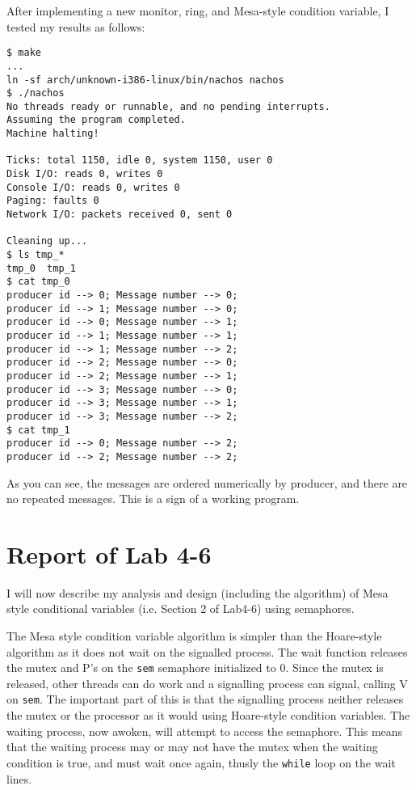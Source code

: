 \documentclass[11pt]{article}
\begin{document}
\begin{question}
    After implementing a new monitor, ring, and Mesa-style condition variable, I tested my results as follows:

    \begin{verbatim}
$ make
...
ln -sf arch/unknown-i386-linux/bin/nachos nachos
$ ./nachos
No threads ready or runnable, and no pending interrupts.
Assuming the program completed.
Machine halting!

Ticks: total 1150, idle 0, system 1150, user 0
Disk I/O: reads 0, writes 0
Console I/O: reads 0, writes 0
Paging: faults 0
Network I/O: packets received 0, sent 0

Cleaning up...
$ ls tmp_*
tmp_0  tmp_1
$ cat tmp_0
producer id --> 0; Message number --> 0;
producer id --> 1; Message number --> 0;
producer id --> 0; Message number --> 1;
producer id --> 1; Message number --> 1;
producer id --> 1; Message number --> 2;
producer id --> 2; Message number --> 0;
producer id --> 2; Message number --> 1;
producer id --> 3; Message number --> 0;
producer id --> 3; Message number --> 1;
producer id --> 3; Message number --> 2;
$ cat tmp_1
producer id --> 0; Message number --> 2;
producer id --> 2; Message number --> 2;
    \end{verbatim}

    As you can see, the messages are ordered numerically by producer, and there are no repeated messages. This is a sign of a working program.

\end{question}

\section{Report of Lab 4-6}

\begin{question}

    I will now describe my analysis and design (including the algorithm) of Mesa style conditional variables (i.e. Section 2 of Lab4-6) using semaphores.

    The Mesa style condition variable algorithm is simpler than the Hoare-style algorithm as it does not wait on the signalled process. The wait function releases the mutex and P's on the {\tt sem} semaphore initialized to 0. Since the mutex is released, other threads can do work and a signalling process can signal, calling V on {\tt sem}. The important part of this is that the signalling process neither releases the mutex or the processor as it would using Hoare-style condition variables. The waiting process, now awoken, will attempt to access the semaphore. This means that the waiting process may or may not have the mutex when the waiting condition is true, and must wait once again, thusly the {\tt while} loop on the wait lines.

\end{question}
\end{document}

